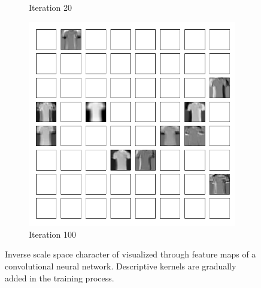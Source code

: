 {{\begin{minipage}[t]{\colwidth}
\begin{figure}[tb]
\begin{subfigure}[b]{\PicWidth}
\caption{Iteration 20}
\end{subfigure}
\hfill%
%
\begin{subfigure}[b]{\PicWidth}
\includegraphics[width=\textwidth,trim=0.35cm 0.35cm 0.2cm 0.35cm,clip]{atelier/FMNIST/FM_e100.pdf}%
\caption{Iteration 100}
\end{subfigure}
\caption{Inverse scale space character of \LinBreg{} visualized through feature maps of a convolutional neural network. 
Descriptive kernels are gradually added in the training process.}
\label{fig:kernels}
\vspace{-10pt}
\end{figure}
%
%
%
%
\vspace{.0em}


\end{minipage}}}
